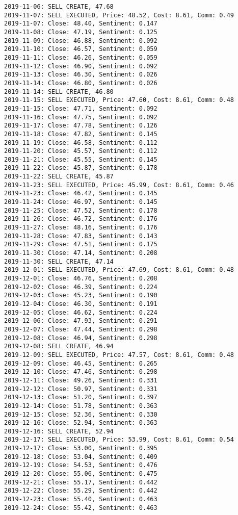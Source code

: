 \documentclass[11pt]{article}
\begin{document}
\begin{Verbatim}[commandchars=\\\{\}]
2019-11-06: SELL CREATE, 47.68
2019-11-07: SELL EXECUTED, Price: 48.52, Cost: 8.61, Comm: 0.49
2019-11-07: Close: 48.40, Sentiment: 0.147
2019-11-08: Close: 47.19, Sentiment: 0.125
2019-11-09: Close: 46.88, Sentiment: 0.092
2019-11-10: Close: 46.57, Sentiment: 0.059
2019-11-11: Close: 46.26, Sentiment: 0.059
2019-11-12: Close: 46.90, Sentiment: 0.092
2019-11-13: Close: 46.30, Sentiment: 0.026
2019-11-14: Close: 46.80, Sentiment: 0.026
2019-11-14: SELL CREATE, 46.80
2019-11-15: SELL EXECUTED, Price: 47.60, Cost: 8.61, Comm: 0.48
2019-11-15: Close: 47.71, Sentiment: 0.092
2019-11-16: Close: 47.75, Sentiment: 0.092
2019-11-17: Close: 47.78, Sentiment: 0.126
2019-11-18: Close: 47.82, Sentiment: 0.145
2019-11-19: Close: 46.58, Sentiment: 0.112
2019-11-20: Close: 45.57, Sentiment: 0.112
2019-11-21: Close: 45.55, Sentiment: 0.145
2019-11-22: Close: 45.87, Sentiment: 0.178
2019-11-22: SELL CREATE, 45.87
2019-11-23: SELL EXECUTED, Price: 45.99, Cost: 8.61, Comm: 0.46
2019-11-23: Close: 46.42, Sentiment: 0.145
2019-11-24: Close: 46.97, Sentiment: 0.145
2019-11-25: Close: 47.52, Sentiment: 0.178
2019-11-26: Close: 46.72, Sentiment: 0.176
2019-11-27: Close: 48.16, Sentiment: 0.176
2019-11-28: Close: 47.83, Sentiment: 0.143
2019-11-29: Close: 47.51, Sentiment: 0.175
2019-11-30: Close: 47.14, Sentiment: 0.208
2019-11-30: SELL CREATE, 47.14
2019-12-01: SELL EXECUTED, Price: 47.69, Cost: 8.61, Comm: 0.48
2019-12-01: Close: 46.76, Sentiment: 0.208
2019-12-02: Close: 46.39, Sentiment: 0.224
2019-12-03: Close: 45.23, Sentiment: 0.190
2019-12-04: Close: 46.30, Sentiment: 0.191
2019-12-05: Close: 46.62, Sentiment: 0.224
2019-12-06: Close: 47.93, Sentiment: 0.291
2019-12-07: Close: 47.44, Sentiment: 0.298
2019-12-08: Close: 46.94, Sentiment: 0.298
2019-12-08: SELL CREATE, 46.94
2019-12-09: SELL EXECUTED, Price: 47.57, Cost: 8.61, Comm: 0.48
2019-12-09: Close: 46.45, Sentiment: 0.265
2019-12-10: Close: 47.46, Sentiment: 0.298
2019-12-11: Close: 49.26, Sentiment: 0.331
2019-12-12: Close: 50.97, Sentiment: 0.331
2019-12-13: Close: 51.20, Sentiment: 0.397
2019-12-14: Close: 51.78, Sentiment: 0.363
2019-12-15: Close: 52.36, Sentiment: 0.330
2019-12-16: Close: 52.94, Sentiment: 0.363
2019-12-16: SELL CREATE, 52.94
2019-12-17: SELL EXECUTED, Price: 53.99, Cost: 8.61, Comm: 0.54
2019-12-17: Close: 53.00, Sentiment: 0.395
2019-12-18: Close: 53.04, Sentiment: 0.409
2019-12-19: Close: 54.53, Sentiment: 0.476
2019-12-20: Close: 55.06, Sentiment: 0.475
2019-12-21: Close: 55.17, Sentiment: 0.442
2019-12-22: Close: 55.29, Sentiment: 0.442
2019-12-23: Close: 55.40, Sentiment: 0.463
2019-12-24: Close: 55.42, Sentiment: 0.463

\end{Verbatim}
\end{document}

